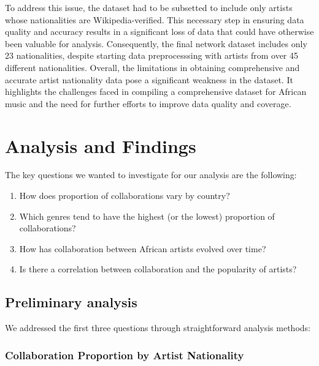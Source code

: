 \documentclass{article}
\begin{document}
To address this issue, the dataset had to be subsetted to include only artists
whose nationalities are Wikipedia-verified. This necessary step in ensuring
data quality and accuracy results in a significant loss of data that could have
otherwise been valuable for analysis. Consequently, the final network dataset
includes only 23 nationalities, despite starting data preprocesssing with
artists from over 45 different nationalities. Overall, the limitations in
obtaining comprehensive and accurate artist nationality data pose a significant
weakness in the dataset. It highlights the challenges faced in compiling a
comprehensive dataset for African music and the need for further efforts to
improve data quality and coverage.

\section{Analysis and Findings}

The key questions we wanted to investigate for our analysis are the following:

\begin{enumerate}
    \item How does proportion of collaborations vary by country?
    \item Which genres tend to have the highest (or the lowest) proportion of
          collaborations?
    \item How has collaboration between African artists evolved over time?
    \item Is there a correlation between collaboration and the popularity of artists?
\end{enumerate}

\subsection{Preliminary analysis}

We addressed the first three questions through straightforward analysis
methods:

\subsubsection{Collaboration Proportion by Artist Nationality}
\end{document}
